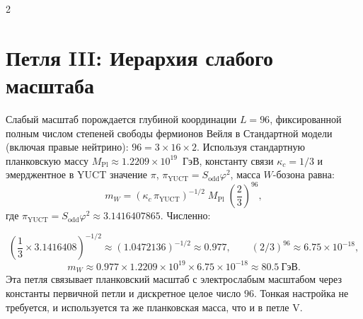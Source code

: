 \documentclass[12pt,a4paper]{article}
\begin{document}
\begin{multicols}{2}
		\section{Петля III: Иерархия слабого масштаба}
		
		Слабый масштаб порождается глубиной координации \(L = 96\), фиксированной полным числом степеней свободы фермионов Вейля в Стандартной модели (включая правые нейтрино): \(96 = 3 \times 16 \times 2\). Используя стандартную планковскую массу \(M_{\mathrm{Pl}} \approx 1.2209 \times 10^{19}\)~ГэВ, константу связи \(\kappa_c = 1/3\) и эмерджентное в YUCT значение \(\pi\), \(\pi_{\mathrm{YUCT}} = S_{\mathrm{odd}}\varphi^2\), масса \(W\)-бозона равна:
		\begin{equation}
			\boxed{m_W = \left( \kappa_c \, \pi_{\mathrm{YUCT}} \right)^{-1/2} \; M_{\mathrm{Pl}} \; \left( \frac{2}{3} \right)^{96}},
		\end{equation}
		где \(\pi_{\mathrm{YUCT}} = S_{\mathrm{odd}}\varphi^2 \approx 3.1416407865\). Численно:
	\end{multicols}
	\small
	\[
	\left( \frac{1}{3} \times 3.1416408 \right)^{-1/2} \approx (1.0472136)^{-1/2} \approx 0.977,\qquad 
	(2/3)^{96} \approx 6.75 \times 10^{-18},
	\]
	\[
	m_W \approx 0.977 \times 1.2209 \times 10^{19} \times 6.75 \times 10^{-18} \approx 80.5\ \text{ГэВ}.
	\]
	Эта петля связывает планковский масштаб с электрослабым масштабом через константы первичной петли и дискретное целое число \(96\). Тонкая настройка не требуется, и используется та же планковская масса, что и в петле V.
\end{document}
